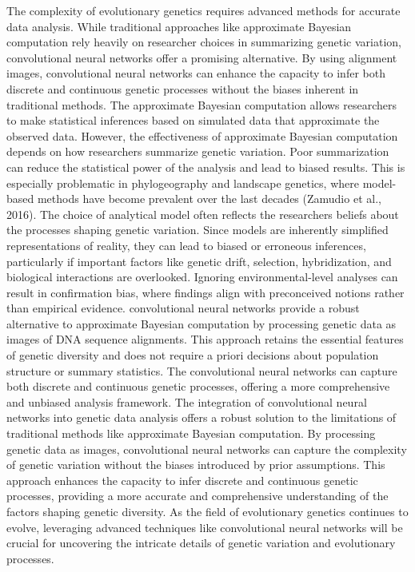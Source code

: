 \documentclass[
]{article}
\begin{document}
The complexity of evolutionary genetics requires advanced methods for
accurate data analysis. While traditional approaches like approximate
Bayesian computation rely heavily on researcher choices in summarizing
genetic variation, convolutional neural networks offer a promising
alternative. By using alignment images, convolutional neural networks
can enhance the capacity to infer both discrete and continuous genetic
processes without the biases inherent in traditional methods. The
approximate Bayesian computation allows researchers to make statistical
inferences based on simulated data that approximate the observed data.
However, the effectiveness of approximate Bayesian computation depends
on how researchers summarize genetic variation. Poor summarization can
reduce the statistical power of the analysis and lead to biased results.
This is especially problematic in phylogeography and landscape genetics,
where model-based methods have become prevalent over the last decades
(Zamudio et al., 2016). The choice of analytical model often reflects
the researchers\textquotesingle{} beliefs about the processes shaping
genetic variation. Since models are inherently simplified
representations of reality, they can lead to biased or erroneous
inferences, particularly if important factors like genetic drift,
selection, hybridization, and biological interactions are overlooked.
Ignoring environmental-level analyses can result in confirmation bias,
where findings align with preconceived notions rather than empirical
evidence. convolutional neural networks provide a robust alternative to
approximate Bayesian computation by processing genetic data as images of
DNA sequence alignments. This approach retains the essential features of
genetic diversity and does not require a priori decisions about
population structure or summary statistics. The convolutional neural
networks can capture both discrete and continuous genetic processes,
offering a more comprehensive and unbiased analysis framework. The
integration of convolutional neural networks into genetic data analysis
offers a robust solution to the limitations of traditional methods like
approximate Bayesian computation. By processing genetic data as images,
convolutional neural networks can capture the complexity of genetic
variation without the biases introduced by prior assumptions. This
approach enhances the capacity to infer discrete and continuous genetic
processes, providing a more accurate and comprehensive understanding of
the factors shaping genetic diversity. As the field of evolutionary
genetics continues to evolve, leveraging advanced techniques like
convolutional neural networks will be crucial for uncovering the
intricate details of genetic variation and evolutionary processes.
\end{document}
